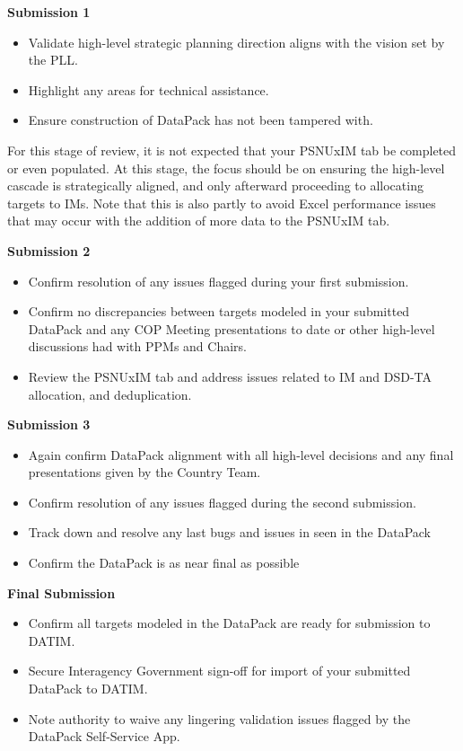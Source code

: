 \documentclass[
  openany]{book}
\begin{document}
\textbf{Submission 1}

\begin{itemize}
\item
  Validate high-level strategic planning direction aligns with the
  vision set by the PLL.
\item
  Highlight any areas for technical assistance.
\item
  Ensure construction of DataPack has not been tampered with.
\end{itemize}

For this stage of review, it is not expected that your PSNUxIM tab be
completed or even populated. At this stage, the focus should be on
ensuring the high-level cascade is strategically aligned, and only
afterward proceeding to allocating targets to IMs. Note that this is
also partly to avoid Excel performance issues that may occur with the
addition of more data to the PSNUxIM tab.

\textbf{Submission 2}

\begin{itemize}
\item
  Confirm resolution of any issues flagged during your first
  submission.
\item
  Confirm no discrepancies between targets modeled in your submitted
  DataPack and any COP Meeting presentations to date or other
  high-level discussions had with PPMs and Chairs.
\item
  Review the PSNUxIM tab and address issues related to IM and DSD-TA
  allocation, and deduplication.
\end{itemize}

\textbf{Submission 3}

\begin{itemize}
\item
  Again confirm DataPack alignment with all high-level decisions and
  any final presentations given by the Country Team.
\item
  Confirm resolution of any issues flagged during the second
  submission.
\item
  Track down and resolve any last bugs and issues in seen in the
  DataPack
\item
  Confirm the DataPack is as near final as possible
\end{itemize}

\textbf{Final Submission}

\begin{itemize}
\item
  Confirm all targets modeled in the DataPack are ready for submission
  to DATIM.
\item
  Secure Interagency Government sign-off for import of your submitted
  DataPack to DATIM.
\item
  Note authority to waive any lingering validation issues flagged by
  the DataPack Self-Service App.
\end{itemize}
\end{document}
